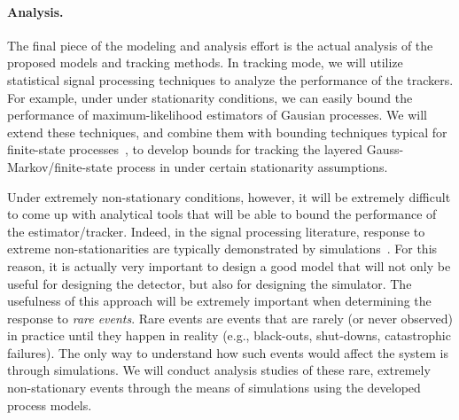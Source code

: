 \paragraph{Analysis.} The final piece of the modeling and analysis effort
is the actual analysis of the proposed models and tracking methods. In
tracking mode, we will utilize statistical signal processing techniques to
analyze the performance of the trackers.  For example, under under
stationarity conditions, we can easily bound the performance of
maximum-likelihood estimators of Gausian processes. We will extend these
techniques, and combine them with bounding techniques typical for
finite-state processes~\cite{Huang09}, to develop bounds for tracking the
layered Gauss-Markov/finite-state process in under certain stationarity assumptions.

Under extremely non-stationary conditions, however, it will be
extremely difficult to come up with analytical tools that will be
able to bound the performance of the estimator/tracker. Indeed, in
the signal processing literature, response to extreme
non-stationarities are typically demonstrated by
simulations~\cite{Yang95,Tanaka05}. For this reason, it is actually
very important to design a good model that will not only be useful
for designing the detector, but also for designing the simulator.
The usefulness of this approach will be extremely important when
determining the response to {\em rare events}. Rare events are
events that are rarely (or never observed) in practice until they
happen in reality (e.g., black-outs, shut-downs, catastrophic
failures). The only way to understand how such events would affect
the system is through simulations. We will conduct analysis studies
of these rare, extremely non-stationary events through the means of
simulations using the developed process models.

